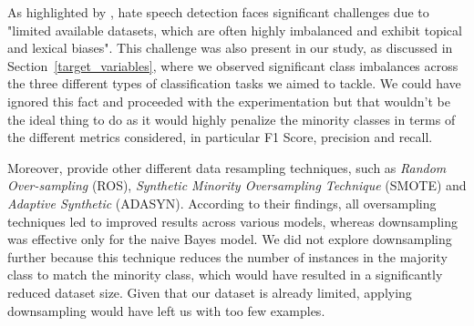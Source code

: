 As highlighted by \cite{liebowitz-2024}, hate speech detection faces significant challenges due to "limited available datasets, which are often highly imbalanced and exhibit topical and lexical biases". This challenge was also present in our study, as discussed in Section~\ref{target_variables}, where we observed significant class imbalances across the three different types of classification tasks we aimed to tackle. We could have ignored this fact and proceeded with the experimentation but that wouldn't be the ideal thing to do as it would highly penalize the minority classes in terms of the different metrics considered, in particular F1 Score, precision and recall.

Moreover, \cite{rathpisey-2019} provide other different data resampling techniques, such as \textit{Random Over-sampling} (ROS),  \textit{Synthetic Minority Oversampling Technique} 
(SMOTE) and \textit{Adaptive Synthetic} (ADASYN). According to their findings, all oversampling techniques led to improved results across various models, whereas downsampling was effective only for the naive Bayes model. We did not explore downsampling further because this technique reduces the number of instances in the majority class to match the minority class, which would have resulted in a significantly reduced dataset size. Given that our dataset is already limited, applying downsampling would have left us with too few examples.

